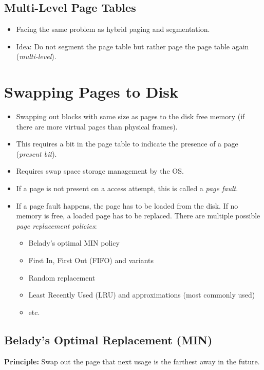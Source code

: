 		\subsection{Multi-Level Page Tables} %
			\label{sec:multilevelpaging}


			\begin{itemize}
				\item Facing the same problem as hybrid paging and segmentation.
				\item Idea: Do not segment the page table but rather page the page table again (\textit{multi-level}).
			\end{itemize}

	\section{Swapping Pages to Disk} %

		\begin{itemize}
			\item Swapping out blocks with same size as pages to the disk free memory (if there are more virtual pages than physical frames).
			\item This requires a bit in the page table to indicate the presence of a page (\textit{present bit}).
			\item Requires swap space storage management by the OS.
			\item If a page is not present on a access attempt, this is called a \textit{page fault}.
			\item If a page fault happens, the page has to be loaded from the disk. If no memory is free, a loaded page has to be replaced. There are multiple possible \textit{page replacement policies}:
				\begin{itemize}
					\item Belady's optimal MIN policy
					\item First In, First Out (FIFO) and variants
					\item Random replacement
					\item Least Recently Used (LRU) and approximations (most commonly used)
					\item etc.
				\end{itemize}
		\end{itemize}

		\subsection{Belady's Optimal Replacement (MIN)}
			\textbf{Principle:} Swap out the page that next usage is the farthest away in the future.


